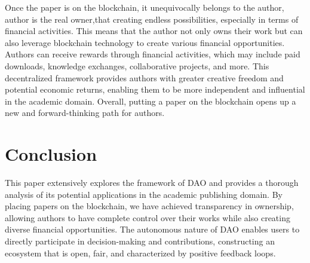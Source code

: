 \documentclass[lettersize,journal]{IEEEtran}
\begin{document}



Once the paper is on the blockchain, it unequivocally belongs to the author, author is the real owner,that creating endless possibilities, especially in terms of financial activities. This means that the author not only owns their work but can also leverage blockchain technology to create various financial opportunities. Authors can receive rewards through financial activities, which may include paid downloads, knowledge exchanges, collaborative projects, and more. This decentralized framework provides authors with greater creative freedom and potential economic returns, enabling them to be more independent and influential in the academic domain. Overall, putting a paper on the blockchain opens up a new and forward-thinking path for authors.



\section{Conclusion \label{sec:conclusion}}
This paper extensively explores the framework of DAO and provides a thorough analysis of its potential applications in the academic publishing domain. By placing papers on the blockchain, we have achieved transparency in ownership, allowing authors to have complete control over their works while also creating diverse financial opportunities. The autonomous nature of DAO enables users to directly participate in decision-making and contributions, constructing an ecosystem that is open, fair, and characterized by positive feedback loops.
\end{document}
